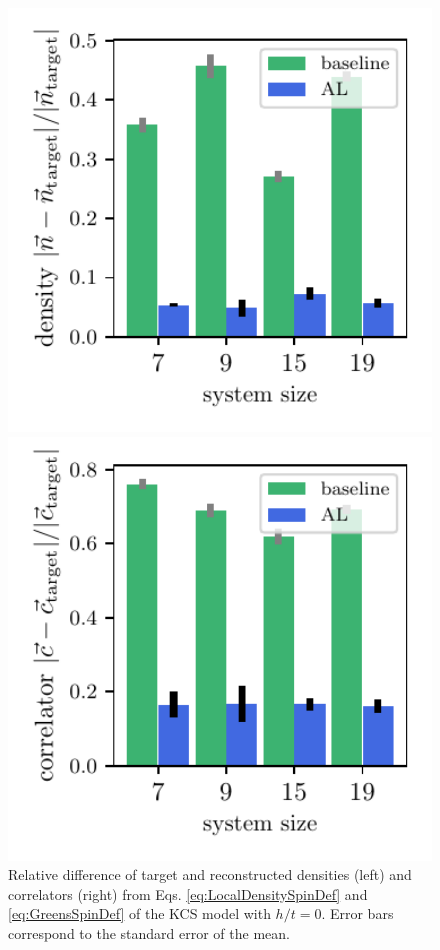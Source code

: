 \documentclass[pra,aps,showpacs,groupedaddress,superscriptaddress,twocolumn,toc=flat,biblatex,footinbib]{revtex4-1}
\begin{document}
\begin{figure}[t]
	\centering
\begin{minipage}[t]{0.23\textwidth}
   \includegraphics[width=1\textwidth]{Fig9a.pdf}
\end{minipage}
\begin{minipage}[t]{0.23\textwidth}
   \includegraphics[width=1\textwidth]{Fig9b.pdf}
\end{minipage}
	\caption[]{Relative difference of target and reconstructed densities (left) and correlators (right) from Eqs. \eqref{eq:LocalDensitySpinDef} and \eqref{eq:GreensSpinDef} of the KCS model with $h/t=0$. Error bars correspond to the standard error of the mean.}
	\label{fig:LGT_h=0}
\end{figure}
\end{document}
